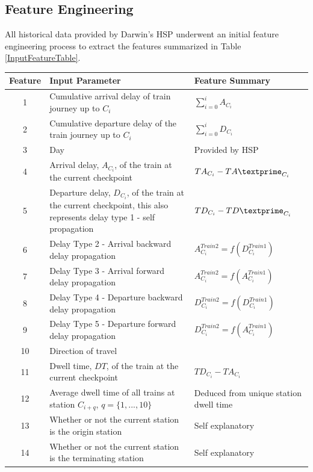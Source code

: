 \documentclass[]{interact}
\theoremstyle{plain}%
\theoremstyle{definition}
\theoremstyle{remark}
\begin{document}
\subsection{Feature Engineering}\label{SubSection:FeatureEngineering}
All historical data provided by Darwin's HSP underwent an initial feature engineering process to extract the features summarized in Table \ref{InputFeatureTable}.

\begin{table}[H] 
{\begin{tabular}{cp{6cm}p{10cm}}\hline
 Feature  &  Input Parameter  &  Feature Summary\\ \hline
 1  &  Cumulative arrival delay of train journey up to $C_i$  &  $\sum_{i=0}^{i}A_{C_i}$ \\ 
 2  &  Cumulative departure delay of the train journey up to $C_i$  &  $\sum_{i=0}^{i}D_{C_i}$\\ 
 3  &  Day  &  Provided by HSP\\ 
 4  &  Arrival delay, $A_{C_i}$, of the train at the current checkpoint  &  $TA_{C_i}-TA\textprime_{C_i}$\\ 
 5  &  Departure delay, $D_{C_i}$, of the train at the current checkpoint, this also represents delay type 1 - self propagation  &  $TD_{C_i}-TD\textprime_{C_i}$\\  
 6  &  Delay Type 2 - Arrival backward delay propagation &  $A_{C_i}^{Train 2} = f(D_{C_i}^{Train 1})$\\  
 7  &  Delay Type 3 - Arrival  forward  delay  propagation & $A_{C_i}^{Train 2} = f(A_{C_i}^{Train 1})$\\  
 8  &  Delay Type 4 - Departure backward delay propagation &  
$D_{C_i}^{Train 2} = f(D_{C_i}^{Train 1})$\\  
 9  &  Delay Type 5 - Departure forward delay propagation &  $D_{C_i}^{Train 2} = f(A_{C_i}^{Train 1})$\\ 
 10  &  Direction of travel  &  \\ 
 11  &  Dwell time, $DT$, of the train at the current checkpoint  &  $TD_{C_i}-TA_{C_i}$\\ 
 12  &  Average dwell time of all trains at station $C_{i+q}$, $q=\{1,...,10\}$  &  Deduced from unique station dwell time\\ 
 13  &  Whether or not the current station is the origin station  &  Self explanatory\\ 
 14  &  Whether or not the current station is the terminating station  &  Self explanatory\\ 

\end{tabular}}
\end{table}
\end{document}
